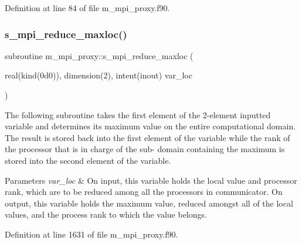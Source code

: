 Definition at line 84 of file m\+\_\+mpi\+\_\+proxy.\+f90.

\mbox{\label{namespacem__mpi__proxy_adaa028bb99f844487de8d6e4507e7734}} 
\subsubsection{\texorpdfstring{s\+\_\+mpi\+\_\+reduce\+\_\+maxloc()}{s\_mpi\_reduce\_maxloc()}}
{\footnotesize\ttfamily subroutine m\+\_\+mpi\+\_\+proxy\+::s\+\_\+mpi\+\_\+reduce\+\_\+maxloc (\begin{DoxyParamCaption}\item[{real(kind(0d0)), dimension(2), intent(inout)}]{var\+\_\+loc }\end{DoxyParamCaption})}



The following subroutine takes the first element of the 2-\/element inputted variable and determines its maximum value on the entire computational domain. The result is stored back into the first element of the variable while the rank of the processor that is in charge of the sub-\/ domain containing the maximum is stored into the second element of the variable. 


\begin{DoxyParams}{Parameters}
{\em var\+\_\+loc} & On input, this variable holds the local value and processor rank, which are to be reduced among all the processors in communicator. On output, this variable holds the maximum value, reduced amongst all of the local values, and the process rank to which the value belongs. \\
\hline
\end{DoxyParams}


Definition at line 1631 of file m\+\_\+mpi\+\_\+proxy.\+f90.

\mbox{\label{namespacem__mpi__proxy_a4d7ec0d1976967504babdf44ec83c1b1}} 
